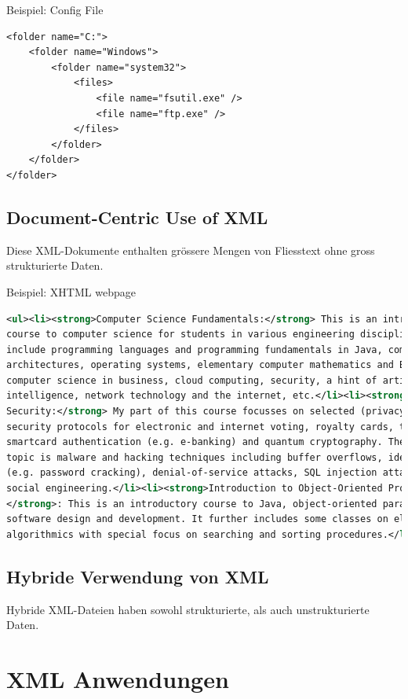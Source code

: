 Beispiel: Config File

\begin{lstlisting}
<folder name="C:">
	<folder name="Windows">
		<folder name="system32">
			<files>
				<file name="fsutil.exe" />
				<file name="ftp.exe" />
			</files>
		</folder>
	</folder>
</folder>
\end{lstlisting}

\subsection{Document-Centric Use of XML}
Diese XML-Dokumente enthalten grössere Mengen von Fliesstext ohne gross strukturierte Daten.

Beispiel: XHTML webpage

\begin{lstlisting}[language=XML]
<ul><li><strong>Computer Science Fundamentals:</strong> This is an introductory
course to computer science for students in various engineering disciplines. Topics
include programming languages and programming fundamentals in Java, computer
architectures, operating systems, elementary computer mathematics and Boolean logic,
computer science in business, cloud computing, security, a hint of artificial
intelligence, network technology and the internet, etc.</li><li><strong>Information
Security:</strong> My part of this course focusses on selected (privacy-preserving)
security protocols for electronic and internet voting, royalty cards, toll pricing,
smartcard authentication (e.g. e-banking) and quantum cryptography. The second main
topic is malware and hacking techniques including buffer overflows, identity theft
(e.g. password cracking), denial-of-service attacks, SQL injection attacks, XSS and
social engineering.</li><li><strong>Introduction to Object-Oriented Programming
</strong>: This is an introductory course to Java, object-oriented paradigms and
software design and development. It further includes some classes on elementary
algorithmics with special focus on searching and sorting procedures.</li></ul>
\end{lstlisting}

\subsection{Hybride Verwendung von XML}
Hybride XML-Dateien haben sowohl strukturierte, als auch unstrukturierte Daten.

\section{XML Anwendungen}
